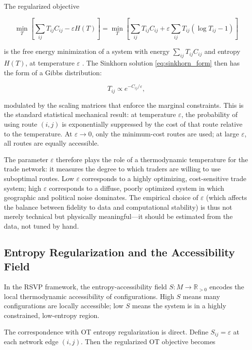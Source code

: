 \documentclass[12pt]{article}
\newcommand{\Tij}{T_{ij}}
\newcommand{\Cij}{C_{ij}}
\newcommand{\eps}{\varepsilon}
\begin{document}
The regularized objective

\begin{equation}
\min_{T} \left[\sum_{ij} \Tij \Cij - \eps H(T)\right] = \min_{T} \left[\sum_{ij} \Tij \Cij + \eps \sum_{ij} \Tij(\log \Tij - 1)\right]
\label{eq:reg_objective}
\end{equation}

is the free energy minimization of a system with energy $\sum_{ij} \Tij \Cij$ and entropy $H(T)$, at temperature $\eps$ \citep[cf.][for the information-theoretic perspective on maximum entropy inference]{jaynes2003, shannon1948}. The Sinkhorn solution \eqref{eq:sinkhorn_form} then has the form of a Gibbs distribution:

\begin{equation}
\Tij \propto e^{-\Cij/\eps},
\label{eq:gibbs}
\end{equation}

modulated by the scaling matrices that enforce the marginal constraints. This is the standard statistical mechanical result: at temperature $\eps$, the probability of using route $(i,j)$ is exponentially suppressed by the cost of that route relative to the temperature. At $\eps \to 0$, only the minimum-cost routes are used; at large $\eps$, all routes are equally accessible.

The parameter $\eps$ therefore plays the role of a thermodynamic temperature for the trade network: it measures the degree to which traders are willing to use suboptimal routes. Low $\eps$ corresponds to a highly optimizing, cost-sensitive trade system; high $\eps$ corresponds to a diffuse, poorly optimized system in which geographic and political noise dominates. The empirical choice of $\eps$ (which affects the balance between fidelity to data and computational stability) is thus not merely technical but physically meaningful---it should be estimated from the data, not tuned by hand.

\subsection{Entropy Regularization and the Accessibility Field}

In the RSVP framework, the entropy-accessibility field $S: M \to \mathbb{R}_{>0}$ encodes the local thermodynamic accessibility of configurations. High $S$ means many configurations are locally accessible; low $S$ means the system is in a highly constrained, low-entropy region.

The correspondence with OT entropy regularization is direct. Define $S_{ij} = \eps$ at each network edge $(i,j)$. Then the regularized OT objective becomes
\end{document}
